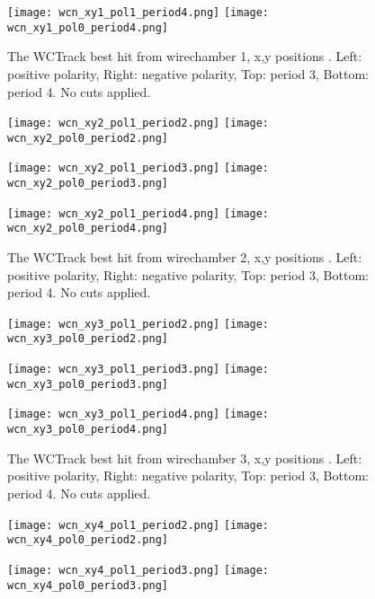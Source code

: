 \begin{description}
{\begin{figure}[h]
	 \texttt{[image: wcn\_xy1\_pol1\_period4.png]}
	 \texttt{[image: wcn\_xy1\_pol0\_period4.png]}
	 
   \caption[short]{The WCTrack  best hit from wirechamber 1,  x,y positions . Left: positive polarity, Right: negative polarity, Top: period 3, Bottom: period 4. No cuts applied.}
   \label{fig_xy1}
  \end{figure}
  
  
         \begin{figure}[h]	
           \centering      
        	\texttt{[image: wcn\_xy2\_pol1\_period2.png]}
	 \texttt{[image: wcn\_xy2\_pol0\_period2.png]}
	 
        	\texttt{[image: wcn\_xy2\_pol1\_period3.png]}
	 \texttt{[image: wcn\_xy2\_pol0\_period3.png]}
	 
	 \texttt{[image: wcn\_xy2\_pol1\_period4.png]}
	 \texttt{[image: wcn\_xy2\_pol0\_period4.png]}
	 
   \caption[short]{The WCTrack  best hit from wirechamber 2,  x,y positions . Left: positive polarity, Right: negative polarity, Top: period 3, Bottom: period 4. No cuts applied.}
   \label{fig_mey}
  \end{figure}
  
  
         \begin{figure}[h]	
           \centering      
        	\texttt{[image: wcn\_xy3\_pol1\_period2.png]}
	 \texttt{[image: wcn\_xy3\_pol0\_period2.png]}
	 
        	\texttt{[image: wcn\_xy3\_pol1\_period3.png]}
	 \texttt{[image: wcn\_xy3\_pol0\_period3.png]}
	 
	 \texttt{[image: wcn\_xy3\_pol1\_period4.png]}
	 \texttt{[image: wcn\_xy3\_pol0\_period4.png]}
	 
   \caption[short]{The WCTrack  best hit from wirechamber 3,  x,y positions . Left: positive polarity, Right: negative polarity, Top: period 3, Bottom: period 4. No cuts applied.}
   \label{fig_mey}
  \end{figure}
  
  
         \begin{figure}[h]	
           \centering      
        	\texttt{[image: wcn\_xy4\_pol1\_period2.png]}
	 \texttt{[image: wcn\_xy4\_pol0\_period2.png]}
	 
        	\texttt{[image: wcn\_xy4\_pol1\_period3.png]}
	 \texttt{[image: wcn\_xy4\_pol0\_period3.png]}
	 

\end{figure}}
\end{description}
